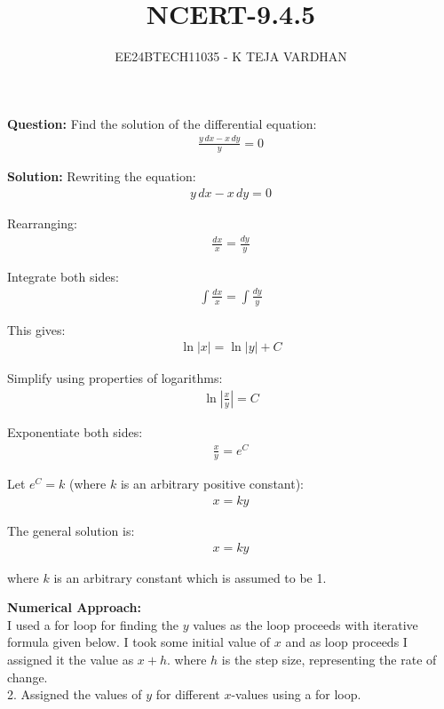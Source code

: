 \documentclass[article]{IEEEtran}
\numberwithin{figure}{enumi}
\begin{document}

\title{NCERT-9.4.5}
\author{EE24BTECH11035 - K TEJA VARDHAN}
{\let\newpage\relax\maketitle}

\noindent\textbf{Question: }  
Find the solution of the differential equation:  
\begin{align}
\frac{y \, dx - x \, dy}{y} = 0
\end{align}

\noindent\textbf{Solution:}  
Rewriting the equation:  
\begin{align}
    y \, dx - x \, dy = 0
\end{align}

\noindent Rearranging:
\begin{align}
    \frac{dx}{x} = \frac{dy}{y}
\end{align}

\noindent Integrate both sides:
\begin{align}
    \int \frac{dx}{x} = \int \frac{dy}{y}
\end{align}

\noindent This gives:
\begin{align}
    \ln|x| = \ln|y| + C
\end{align}

\noindent Simplify using properties of logarithms:
\begin{align}
    \ln\left|\frac{x}{y}\right| = C
\end{align}

\noindent Exponentiate both sides:
\begin{align}
    \frac{x}{y} = e^{C}
\end{align}

\noindent Let \( e^{C} = k \) (where \( k \) is an arbitrary positive constant):
\begin{align}
    x = k y
\end{align}

\noindent The general solution is:
\begin{align}
    \boxed{x = k y}
\end{align}

\noindent where \( k \) is an arbitrary constant which is assumed to be 1.

\vspace{0.5em}

\noindent\textbf{Numerical Approach:}\\ I used a for loop for finding the $y$ values as the loop proceeds with iterative formula given below. I took some initial value of $x$ and as loop proceeds I assigned it the value as $x+h$. where $h$ is the step size, representing the rate of change. 
\\2. Assigned the values of $y$ for different $x$-values using a for loop.  
\end{document}
